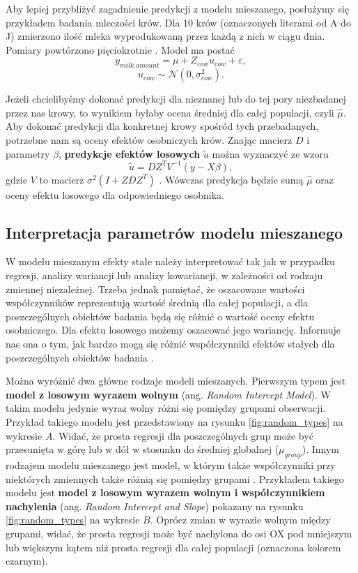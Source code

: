 \documentclass[12pt]{mwbk}
\theoremstyle{plain}
\theoremstyle{definition}
\theoremstyle{definition}
\begin{document}
 Aby lepiej przybliżyć zagadnienie predykcji z modelu mieszanego, posłużymy się przykładem badania mleczości krów. Dla 10 krów (oznaczonych literami od A do J) zmierzono ilość mleka wyprodukowaną przez każdą z nich w ciągu dnia. Pomiary powtórzono pięciokrotnie \cite{biecek}.
Model ma postać 
$$y_{milk.amount}=\mu+Z_{cow}u_{cow}+\varepsilon,$$
$$u_{cow} \sim \mathcal{N}(0, \sigma^2_{cow}).$$

Jeżeli chcielibyśmy dokonać predykcji dla nieznanej lub do tej pory niezbadanej przez nas krowy, to wynikiem byłaby ocena średniej dla całej populacji, czyli $\hat{\mu}$.
Aby dokonać predykcji dla konkretnej krowy spośród tych przebadanych, potrzebne nam są oceny efektów osobniczych krów.
Znając macierz $D$ i parametry $\beta$, \textbf{predykcje efektów losowych} $\widetilde{u}$ można wyznaczyć ze wzoru
$$\widetilde{u}=DZ^TV^{-1}(y-X\beta),$$
gdzie $V$ to macierz $\sigma^2(I+ZDZ^T)$ \cite{biecek}. Wówczas predykcja będzie sumą $\hat{\mu}$ oraz oceny efektu losowego dla odpowiedniego osobnika.

 
 
 
 
 \subsection{Interpretacja parametrów modelu mieszanego}
 W modelu mieszanym efekty stałe należy interpretować tak jak w przypadku regresji, analizy wariancji lub analizy kowariancji, w zależności od rodzaju zmiennej niezależnej. Trzeba jednak pamiętać, że oszacowane wartości współczynników reprezentują wartość średnią dla całej populacji, a dla poszczególnych obiektów badania będą się różnić o wartość oceny efektu osobniczego.
 Dla efektu losowego możemy oszacować jego wariancję. Informuje nas ona o tym, jak bardzo mogą się różnić współczynniki efektów stałych dla poszczególnych obiektów badania
 \cite{experimental}.
 
 Można wyróżnić dwa główne rodzaje modeli mieszanych. Pierwszym typem jest \textbf{model z losowym wyrazem wolnym} (ang. \textit{Random Intercept Model}). W takim modelu jedynie wyraz wolny różni się pomiędzy grupami obserwacji\cite{insurance}. Przykład takiego modelu jest przedstawiony na rysunku \ref{fig:random_types} na wykresie $A$. Widać, że prosta regresji dla poszczególnych grup może być przesunięta w górę lub w dół w stosunku do średniej globalnej ($\mu_{group}$). 
 Innym rodzajem modelu mieszanego jest model, w którym także współczynniki przy niektórych zmiennych także różnią się pomiędzy grupami \cite{insurance}. Przykładem takiego modelu jest \textbf{model z losowym wyrazem wolnym i współczynnikiem nachylenia} (ang. \textit{Random Intercept and Slope}) pokazany na rysunku \ref{fig:random_types} na wykresie $B$. Oprócz zmian w wyrazie wolnym między grupami, widać, że prosta regresji może być nachylona do osi OX pod mniejszym lub większym kątem niż prosta regresji dla całej populacji (oznaczona kolorem czarnym).
 
\end{document}
